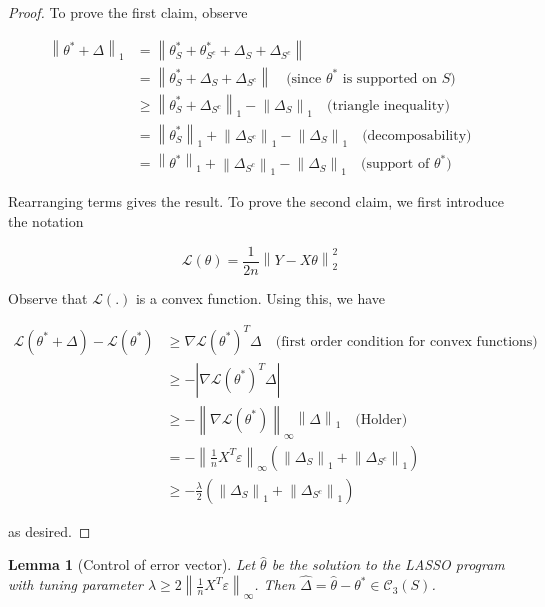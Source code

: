\documentclass{article}
\newcommand{\cC}{\mathcal{C}}
\newcommand{\cL}{\mathcal{L}}
\newcommand{\norm}[1]{\left\|#1\right\|}
\newcommand{\eps}{\varepsilon} %
\newtheorem{lemma}{Lemma}
\begin{document}
\begin{proof}
  To prove the first claim, observe

  \begin{align*}
	\norm{\theta^{*} + \Delta}_{1}
	&= \norm{\theta^{*}_{S} + \theta^{*}_{S^{c}} + \Delta_{S} + \Delta_{S^{c}}} \\
	&= \norm{\theta^{*}_{S} + \Delta_{S} + \Delta_{S^{c}}} \quad \textrm{(since $\theta^{*}$ is supported on $S$)} \\
	&\geq \norm{\theta^{*}_{S} + \Delta_{S^{c}}}_{1} - \norm{\Delta_{S}}_{1} \quad \textrm{(triangle inequality)} \\
	&= \norm{\theta^{*}_{S}}_{1} + \norm{\Delta_{S^{c}}}_{1} - \norm{\Delta_{S}}_{1} \quad \textrm{(decomposability)} \\
	&= \norm{\theta^{*}}_{1} + \norm{\Delta_{S^{c}}}_{1} - \norm{\Delta_{S}}_{1} \quad \textrm{(support of $\theta^{*}$)}
  \end{align*}

  Rearranging terms gives the result. To prove the second claim, we first introduce the notation

  $$\cL(\theta) = \frac{1}{2n}\norm{Y - X\theta}_{2}^{2}$$

  Observe that $\cL(.)$ is a convex function. Using this, we have

  \begin{align*}
	\cL(\theta^{*} + \Delta) - \cL(\theta^{*})
	&\geq \nabla \cL(\theta^{*})^{T}\Delta \quad \textrm{(first order condition for convex functions)} \\
	& \geq - |\nabla \cL(\theta^{*})^{T}\Delta | \\
	&\geq -\norm{\nabla \cL(\theta^{*})}_{\infty}\norm{\Delta}_{1} \quad \textrm{(Holder)} \\
	&= - \norm{\frac1nX^{T}\eps}_{\infty}(\norm{\Delta_{S}}_{1} + \norm{\Delta_{S^{c}}}_{1}) \\
	&\geq - \frac{\lambda}{2}(\norm{\Delta_{S}}_{1} + \norm{\Delta_{S^{c}}}_{1})
  \end{align*}

  as desired.
\end{proof}

\begin{lemma}[Control of error vector]\label{lemma:error-in-cone-lasso}
  Let $\hat{\theta}$ be the solution to the LASSO program with tuning parameter $\lambda \geq 2\norm{\frac1nX^{T}\eps}_{\infty}$. Then $\hat{\Delta} = \hat{\theta} - \theta^{*} \in \cC_{3}(S)$.
\end{lemma}
\end{document}
